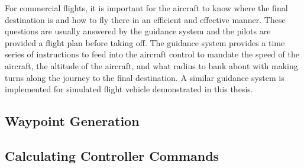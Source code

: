 \documentclass[../chapter_2.tex]{subfiles}
\begin{document}
For commercial flights, it is important for the aircraft to know where the final destination is and how to fly there in an efficient and effective manner. These questions are usually answered by the guidance system and the pilots are provided a flight plan before taking off. The guidance system provides a time series of instructions to feed into the aircraft control to mandate the speed of the aircraft, the altitude of the aircraft, and what radius to bank about with making turns along the journey to the final destination. A similar guidance system is implemented for simulated flight vehicle demonstrated in this thesis. 

\subsection{Waypoint Generation}


\subsection{Calculating Controller Commands}

\end{document}
